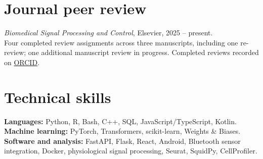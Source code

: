 \documentclass[11pt,letterpaper]{article}
\begin{document}
\section{Journal peer review}
\textit{Biomedical Signal Processing and Control}, Elsevier, 2025 -- present.\\
Four completed review assignments across three manuscripts, including one re-review; one additional manuscript review in progress. Completed reviews recorded on \href{https://orcid.org/0000-0002-4829-7726}{ORCID}.

\section{Technical skills}
\textbf{Languages:} Python, R, Bash, C++, SQL, JavaScript/TypeScript, Kotlin.\\
\textbf{Machine learning:} PyTorch, Transformers, scikit-learn, Weights \& Biases.\\
\textbf{Software and analysis:} FastAPI, Flask, React, Android, Bluetooth sensor integration, Docker, physiological signal processing, Seurat, SquidPy, CellProfiler.


\newpage
\end{document}
